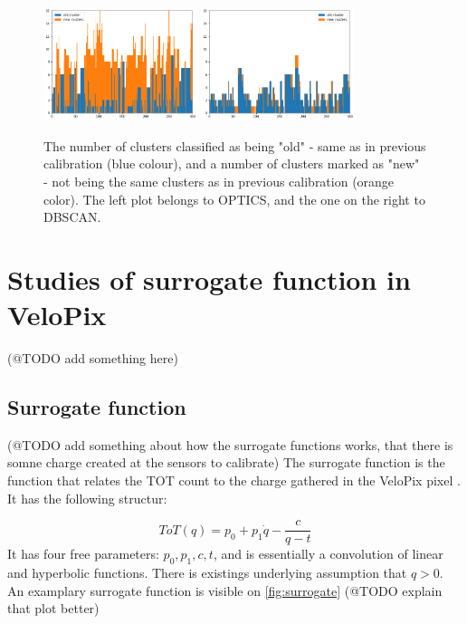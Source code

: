 \begin{figure}[H]
\centering
\includegraphics[width=0.4\textwidth]{figures/chapter4/velopix_clusters/optics_progress.png}
\includegraphics[width=0.4\textwidth]{figures/chapter4/velopix_clusters/dbscan_progress.png}
\caption{ The number of clusters classified as being "old" - same as in previous calibration (blue colour), and a number of clusters marked as "new" - not being the same clusters as in previous calibration (orange color). The left plot belongs to OPTICS, and the one on the right to DBSCAN.
}
\label{fig:progress}
\end{figure}

\section{Studies of surrogate function in VeloPix}

(@TODO add something here)
\subsection{Surrogate function}

(@TODO add something about how the surrogate functions works, that there is somne charge created at the sensors to calibrate)
The surrogate function is the function that relates the TOT count to the charge gathered in the VeloPix pixel \cite{Tsopelas:2016cjb}.
It has the following structur:



\begin{equation}
  \label{eq:surrogate}
  ToT(q) = p_{0} + p_{1} \dot q - \frac{c}{q-t}
  \end{equation}
It has four free parameters: $p_{0},p_{1},c,t$, and is essentially a convolution of linear and hyperbolic functions. There is existings underlying assumption that $q > 0$.
An examplary surrogate function is visible on \ref{fig:surrogate} (@TODO explain that plot better)


